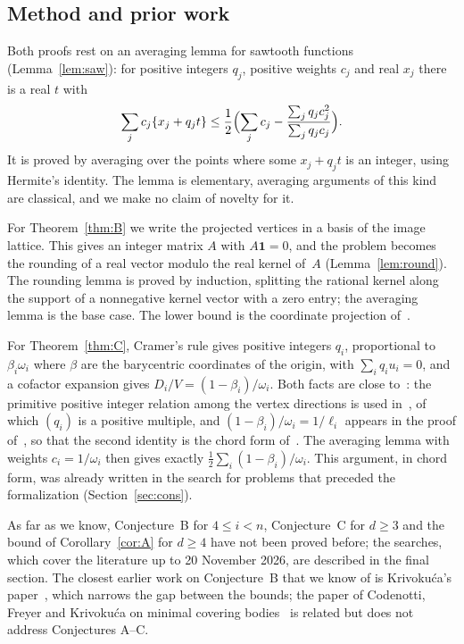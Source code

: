\documentclass[11pt]{article}
\theoremstyle{definition}
\theoremstyle{remark}
\newcommand{\one}{\mathbf 1}
\newcommand{\fr}[1]{\{#1\}}
\begin{document}
\subsection{Method and prior work}
Both proofs rest on an averaging lemma for sawtooth functions
(Lemma~\ref{lem:saw}): for positive integers $q_j$, positive weights $c_j$ and
real $x_j$ there is a real $t$ with
\[
\sum_jc_j\fr{x_j+q_jt}\le\frac12\Bigl(\sum_jc_j-\frac{\sum_jq_jc_j^2}{\sum_jq_jc_j}\Bigr).
\]
It is proved by averaging over the points where some $x_j+q_jt$ is an integer,
using Hermite's identity. The lemma is elementary, averaging arguments of
this kind are classical, and we make no claim of novelty for it.

For Theorem~\ref{thm:B} we write the projected vertices in a basis of the image
lattice. This gives an integer matrix $A$ with $A\one=0$, and the problem
becomes the rounding of a real vector modulo the real kernel of~$A$
(Lemma~\ref{lem:round}). The rounding lemma is proved by induction, splitting
the rational kernel along the support of a nonnegative kernel vector with a
zero entry; the averaging lemma is the base case. The lower bound is the
coordinate projection of~\cite{gms}.

For Theorem~\ref{thm:C}, Cramer's rule gives positive integers $q_i$,
proportional to $\beta_i\omega_i$ where $\beta$ are the barycentric coordinates
of the origin, with $\sum_iq_iu_i=0$, and a cofactor expansion gives
$D_i/V=(1-\beta_i)/\omega_i$. Both facts are close to~\cite{css}: the
primitive positive integer relation among the vertex directions is used
in~\cite[Section~4.3]{css}, of which $(q_i)$ is a positive multiple, and
$(1-\beta_i)/\omega_i=1/\ell_i$ appears in the proof of~\cite[Corollary~4.3]{css},
so that the second identity is the chord form of~\cite[Lemma~4.1]{css}. The
averaging lemma with weights $c_i=1/\omega_i$ then gives exactly
$\frac12\sum_i(1-\beta_i)/\omega_i$. This argument, in chord form, was already
written in the search for problems that preceded the formalization
(Section~\ref{sec:cons}).

As far as we know, Conjecture~B for $4\le i<n$, Conjecture~C for $d\ge3$ and the
bound of Corollary~\ref{cor:A} for $d\ge4$ have not been proved before; the
searches, which cover the literature up to 20 November 2026, are described in
the final section. The closest earlier work on Conjecture~B that we know of
is Krivokuća's paper~\cite{kr}, which narrows the gap between the bounds; the
paper of Codenotti, Freyer and Krivokuća on minimal covering
bodies~\cite{cfk} is related but does not address Conjectures A--C.
\end{document}
